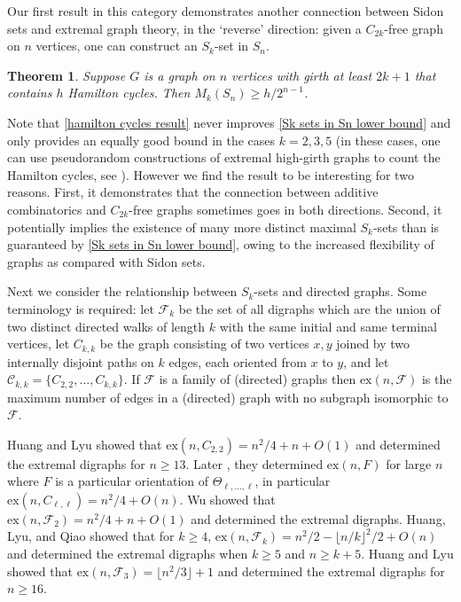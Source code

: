 \documentclass[12pt]{article}
\newtheorem{thm}{Theorem}
\begin{document}
Our first result in this category demonstrates another connection between Sidon sets and extremal graph theory, in the `reverse' direction: given a $C_{2k}$-free graph on $n$ vertices, one can construct an $S_k$-set in $S_n$.

\begin{thm} \label{hamilton cycles result}
    Suppose $G$ is a graph on $n$ vertices with girth at least $2k+1$ that contains $h$ Hamilton cycles. Then $M_k(S_n)\ge h/2^{n-1}$.
\end{thm}

Note that \autoref{hamilton cycles result} never improves \autoref{Sk sets in Sn lower bound} and only provides an equally good bound in the cases $k=2,3,5$ (in these cases, one can use pseudorandom constructions of extremal high-girth graphs to count the Hamilton cycles, see \cite{byrne2024improved}). However we find the result to be interesting for two reasons. First, it demonstrates that the connection between additive combinatorics and $C_{2k}$-free graphs sometimes goes in both directions. Second, it potentially implies the existence of many more distinct maximal $S_k$-sets than is guaranteed by \autoref{Sk sets in Sn lower bound}, owing to the increased flexibility of graphs as compared with Sidon sets. 

Next we consider the relationship between $S_k$-sets and directed graphs. Some terminology is required: let $\mathcal F_k$ be the set of all digraphs which are the union of two distinct directed walks of length $k$ with the same initial and same terminal vertices, let $C_{k,k}$ be the graph consisting of two vertices $x,y$ joined by two internally disjoint paths on $k$ edges, each oriented from $x$ to $y$, and let $\mathcal C_{k,k}=\{C_{2,2},\ldots,C_{k,k}\}$. If $\mathcal F$ is a family of (directed) graphs then $\mathrm{ex}(n,\mathcal F)$ is the maximum number of edges in a (directed) graph with no subgraph isomorphic to $\mathcal F$.

Huang and Lyu \cite{huang2020extremal} showed that $\mathrm{ex}(n,C_{2,2})=n^2/4+n+O(1)$ and determined the extremal digraphs for $n\ge 13$. Later \cite{huang2024extremal}, they determined $\mathrm{ex}(n,F)$ for large $n$ where $F$ is a particular orientation of $\Theta_{\ell,\ldots,\ell}$, in particular $\mathrm{ex}(n,C_{\ell,\ell})=n^2/4+O(n)$. Wu \cite{wu20100} showed that $\mathrm{ex}(n,\mathcal F_2)=n^2/4+n+O(1)$ and determined the extremal digraphs. Huang, Lyu, and Qiao \cite{huang2019turan} showed that for $k\ge 4$, $\mathrm{ex}(n,\mathcal F_k)=n^2/2-\lfloor n/k\rfloor^2/2+O(n)$ and determined the extremal digraphs when $k\ge 5$ and $n\ge k+5$. Huang and Lyu \cite{huang2022extremal} showed that $\mathrm{ex}(n,\mathcal F_3)=\lfloor n^2/3\rfloor+1$ and determined the extremal digraphs for $n\ge 16$. 
\end{document}
